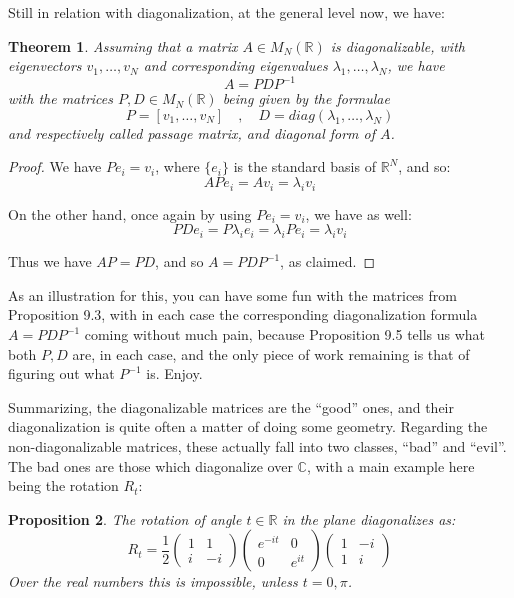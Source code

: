 \documentclass[12pt]{amsbook}
\newtheorem{theorem}{Theorem}[chapter]
\newtheorem{proposition}[theorem]{Proposition}
\begin{document}
Still in relation with diagonalization, at the general level now, we have:


\begin{theorem}
Assuming that a matrix $A\in M_N(\mathbb R)$ is diagonalizable, with eigenvectors $v_1,\ldots,v_N$ and corresponding eigenvalues $\lambda_1,\ldots,\lambda_N$, we have
$$A=PDP^{-1}$$
with the matrices $P,D\in M_N(\mathbb R)$ being given by the formulae
$$P=[v_1,\ldots,v_N]\quad,\quad 
D=diag(\lambda_1,\ldots,\lambda_N)$$
and respectively called passage matrix, and diagonal form of $A$.
\end{theorem}

\begin{proof}
We have $Pe_i=v_i$, where $\{e_i\}$ is the standard basis of $\mathbb R^N$, and so:
$$APe_i
=Av_i
=\lambda_iv_i$$

On the other hand, once again by using $Pe_i=v_i$, we have as well:
$$PDe_i
=P\lambda_ie_i
=\lambda_iPe_i
=\lambda_iv_i$$

Thus we have $AP=PD$, and so $A=PDP^{-1}$, as claimed.
\end{proof}

As an illustration for this, you can have some fun with the matrices from Proposition 9.3, with in each case the corresponding diagonalization formula $A=PDP^{-1}$ coming without much pain, because Proposition 9.5 tells us what both $P,D$ are, in each case, and the only piece of work remaining is that of figuring out what $P^{-1}$ is. Enjoy.

\bigskip

Summarizing, the diagonalizable matrices are the ``good'' ones, and their diagonalization is quite often a matter of doing some geometry. Regarding the non-diagonalizable matrices, these actually fall into two classes, ``bad'' and ``evil''. The bad ones are those which diagonalize over $\mathbb C$, with a main example here being the rotation $R_t$:

\begin{proposition}
The rotation of angle $t\in\mathbb R$ in the plane diagonalizes as:
$$R_t=\frac{1}{2}\begin{pmatrix}1&1\\i&-i\end{pmatrix}
\begin{pmatrix}e^{-it}&0\\0&e^{it}\end{pmatrix}
\begin{pmatrix}1&-i\\1&i\end{pmatrix}$$
Over the real numbers this is impossible, unless $t=0,\pi$.
\end{proposition}
\end{document}
